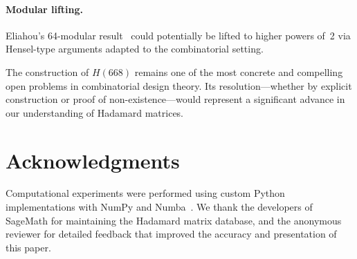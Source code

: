 \documentclass[11pt,a4paper]{article}
\begin{document}
\paragraph{Modular lifting.}
Eliahou's 64-modular result~\cite{eliahou2025modular} could potentially
be lifted to higher powers of~2 via Hensel-type arguments adapted to the
combinatorial setting.

\medskip
The construction of $H(668)$ remains one of the most concrete and
compelling open problems in combinatorial design theory.  Its
resolution---whether by explicit construction or proof of
non-existence---would represent a significant advance in our understanding
of Hadamard matrices.

\section*{Acknowledgments}

Computational experiments were performed using custom Python
implementations with NumPy and Numba~\cite{lam2015numba}.  We thank the
developers of SageMath for maintaining the Hadamard matrix database, and
the anonymous reviewer for detailed feedback that improved the accuracy
and presentation of this paper.



\end{document}
